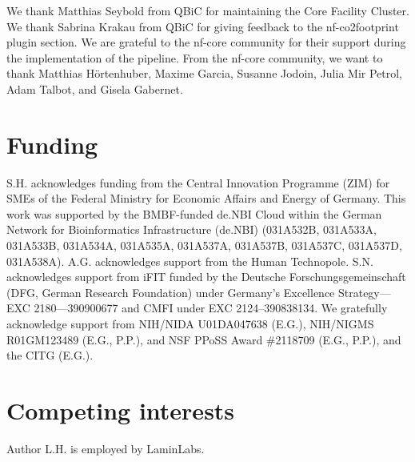 \documentclass{bioinfo}
\theoremstyle{definition}
\begin{document}
	We thank Matthias Seybold from QBiC for maintaining the Core Facility Cluster. 
	We thank Sabrina Krakau from QBiC for giving feedback to the nf-co2footprint plugin section. 
	We are grateful to the nf-core community for their support during the implementation of the pipeline. 
	From the nf-core community, we want to thank Matthias Hörtenhuber, Maxime Garcia, Susanne Jodoin, Julia Mir Petrol, Adam Talbot, and Gisela Gabernet. 

	\vspace{-0.6cm}
	
	\section*{Funding}
	
	 S.H. acknowledges funding from the Central Innovation Programme (ZIM) for SMEs of the Federal Ministry for Economic Affairs and Energy of Germany. This work was supported by the BMBF-funded de.NBI Cloud within the German Network for Bioinformatics Infrastructure (de.NBI) (031A532B, 031A533A, 031A533B, 031A534A, 031A535A, 031A537A, 031A537B, 031A537C, 031A537D, 031A538A). A.G. acknowledges support from the Human Technopole. S.N. acknowledges support from iFIT funded by the Deutsche Forschungsgemeinschaft (DFG, German Research Foundation) under Germany’s Excellence Strategy—EXC 2180—390900677 and CMFI under EXC 2124–390838134. 
     We gratefully acknowledge support from NIH/NIDA U01DA047638 (E.G.), NIH/NIGMS R01GM123489 (E.G., P.P.), and NSF PPoSS Award \#2118709 (E.G., P.P.), and the CITG (E.G.).
	 
	\vspace{-0.6cm}
	
	\section*{Competing interests}
	Author L.H. is employed by LaminLabs.
	
	\vspace{-0.6cm}
	
\end{document}
